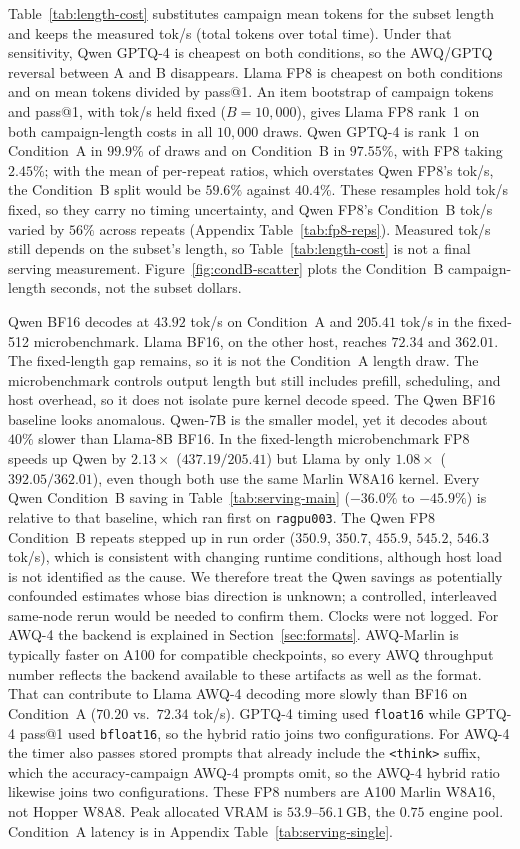 \documentclass[11pt,a4paper]{article}
\begin{document}
Table~\ref{tab:length-cost} substitutes campaign mean tokens for the subset length and keeps the measured tok/s (total tokens over total time). Under that sensitivity, Qwen GPTQ-4 is cheapest on both conditions, so the AWQ/GPTQ reversal between A and B disappears. Llama FP8 is cheapest on both conditions and on mean tokens divided by pass@1. An item bootstrap of campaign tokens and pass@1, with tok/s held fixed ($B=10{,}000$), gives Llama FP8 rank~1 on both campaign-length costs in all $10{,}000$ draws. Qwen GPTQ-4 is rank~1 on Condition~A in $99.9\%$ of draws and on Condition~B in $97.55\%$, with FP8 taking $2.45\%$; with the mean of per-repeat ratios, which overstates Qwen FP8's tok/s, the Condition~B split would be $59.6\%$ against $40.4\%$. These resamples hold tok/s fixed, so they carry no timing uncertainty, and Qwen FP8's Condition~B tok/s varied by $56\%$ across repeats (Appendix Table~\ref{tab:fp8-reps}). Measured tok/s still depends on the subset's length, so Table~\ref{tab:length-cost} is not a final serving measurement. Figure~\ref{fig:condB-scatter} plots the Condition~B campaign-length seconds, not the subset dollars.

Qwen BF16 decodes at $43.92$ tok/s on Condition~A and $205.41$ tok/s in the fixed-512 microbenchmark. Llama BF16, on the other host, reaches $72.34$ and $362.01$. The fixed-length gap remains, so it is not the Condition~A length draw. The microbenchmark controls output length but still includes prefill, scheduling, and host overhead, so it does not isolate pure kernel decode speed. The Qwen BF16 baseline looks anomalous. Qwen-7B is the smaller model, yet it decodes about $40\%$ slower than Llama-8B BF16. In the fixed-length microbenchmark FP8 speeds up Qwen by $2.13\times$ ($437.19/205.41$) but Llama by only $1.08\times$ ($392.05/362.01$), even though both use the same Marlin W8A16 kernel. Every Qwen Condition~B saving in Table~\ref{tab:serving-main} ($-36.0\%$ to $-45.9\%$) is relative to that baseline, which ran first on \texttt{ragpu003}. The Qwen FP8 Condition~B repeats stepped up in run order ($350.9$, $350.7$, $455.9$, $545.2$, $546.3$ tok/s), which is consistent with changing runtime conditions, although host load is not identified as the cause. We therefore treat the Qwen savings as potentially confounded estimates whose bias direction is unknown; a controlled, interleaved same-node rerun would be needed to confirm them. Clocks were not logged. For AWQ-4 the backend is explained in Section~\ref{sec:formats}. AWQ-Marlin is typically faster on A100 for compatible checkpoints, so every AWQ throughput number reflects the backend available to these artifacts as well as the format. That can contribute to Llama AWQ-4 decoding more slowly than BF16 on Condition~A ($70.20$ vs.\ $72.34$ tok/s). GPTQ-4 timing used \texttt{float16} while GPTQ-4 pass@1 used \texttt{bfloat16}, so the hybrid ratio joins two configurations. For AWQ-4 the timer also passes stored prompts that already include the \texttt{<think>} suffix, which the accuracy-campaign AWQ-4 prompts omit, so the AWQ-4 hybrid ratio likewise joins two configurations. These FP8 numbers are A100 Marlin W8A16, not Hopper W8A8. Peak allocated VRAM is $53.9$--$56.1$\,GB, the $0.75$ engine pool. Condition~A latency is in Appendix Table~\ref{tab:serving-single}.
\end{document}
